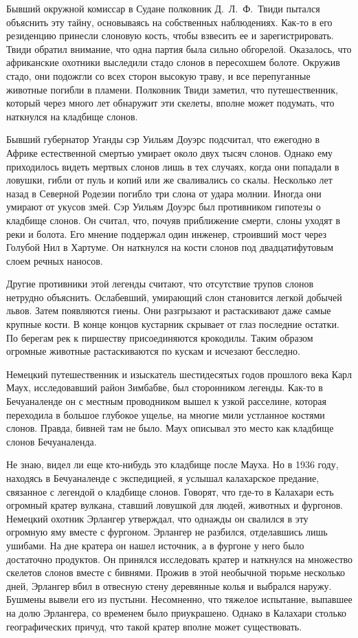 \documentclass[12pt,a4paper,twoside,openany,svgnames]{memoir}
\begin{document}
Бывший окружной комиссар в Судане полковник Д.~Л.~Ф.~Твиди пытался объяснить эту тайну, основываясь на собственных наблюдениях. Как-то в его резиденцию принесли слоновую кость, чтобы взвесить ее и зарегистрировать. Твиди обратил внимание, что одна партия была сильно обгорелой. Оказалось, что африканские охотники выследили стадо слонов в пересохшем болоте. Окружив стадо, они подожгли со всех сторон высокую траву, и все перепуганные животные погибли в пламени. Полковник Твиди заметил, что путешественник, который через много лет обнаружит эти скелеты, вполне может подумать, что наткнулся на кладбище слонов.

Бывший губернатор Уганды сэр Уильям Доуэрс подсчитал, что ежегодно в Африке естественной смертью умирает около двух тысяч слонов. Однако ему приходилось видеть мертвых слонов лишь в тех случаях, когда они попадали в ловушки, гибли от пуль и копий или же сваливались со скалы. Несколько лет назад в Северной Родезии погибло три слона от удара молнии. Иногда они умирают от укусов змей. Сэр Уильям Доуэрс был противником гипотезы о кладбище слонов. Он считал, что, почуяв приближение смерти, слоны уходят в реки и болота. Его мнение поддержал один инженер, строивший мост через Голубой Нил в Хартуме. Он наткнулся на кости слонов под двадцатифутовым слоем речных наносов.

Другие противники этой легенды считают, что отсутствие трупов слонов нетрудно объяснить. Ослабевший, умирающий слон становится легкой добычей львов. Затем появляются гиены. Они разгрызают и растаскивают даже самые крупные кости. В конце концов кустарник скрывает от глаз последние остатки. По берегам рек к пиршеству присоединяются крокодилы. Таким образом огромные животные растаскиваются по кускам и исчезают бесследно.

Немецкий путешественник и изыскатель шестидесятых годов прошлого века Карл Маух, исследовавший район Зимбабве, был сторонником легенды. Как-то в Бечуаналенде он с местным проводником вышел к узкой расселине, которая переходила в большое глубокое ущелье, на многие мили устланное костями слонов. Правда, бивней там не было. Маух описывал это место как кладбище слонов Бечуаналенда.

Не знаю, видел ли еще кто-нибудь это кладбище после Мауха. Но в 1936 году, находясь в Бечуаналенде с экспедицией, я услышал калахарское предание, связанное с легендой о кладбище слонов. Говорят, что где-то в Калахари есть огромный кратер вулкана, ставший ловушкой для людей, животных и фургонов. Немецкий охотник Эрлангер утверждал, что однажды он свалился в эту огромную яму вместе с фургоном. Эрлангер не разбился, отделавшись лишь ушибами. На дне кратера он нашел источник, а в фургоне у него было достаточно продуктов. Он принялся исследовать кратер и наткнулся на множество скелетов слонов вместе с бивнями. Прожив в этой необычной тюрьме несколько дней, Эрлангер вбил в отвесную стену деревянные колья и выбрался наружу. Бушмены вывели его из пустыни. Несомненно, что тяжелое испытание, выпавшее на долю Эрлангера, со временем было приукрашено. Однако в Калахари столько географических причуд, что такой кратер вполне может существовать.
\end{document}
